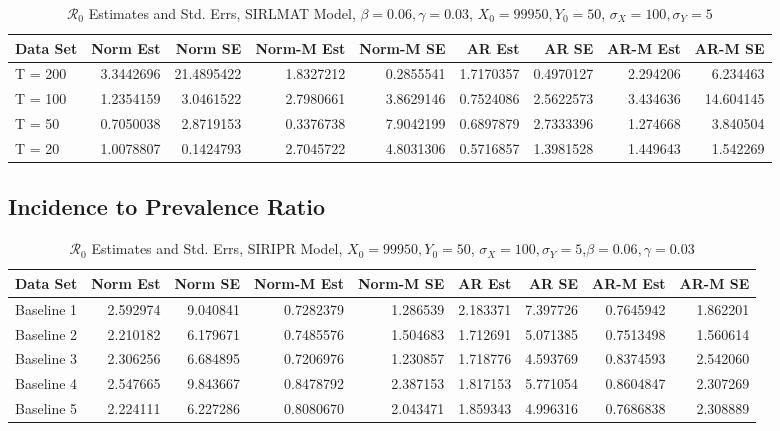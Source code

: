 \documentclass[12pt]{article}
\newcommand{\rr}{\ensuremath{\mathcal{R}_0}}
\begin{document}
\begin{table}[H]
	
	\caption{\label{tab:}$\rr$ Estimates and Std. Errs, SIRLMAT Model,
		$\beta = 0.06, \gamma = 0.03$, $X_0 = 99950, Y_0 = 50$, $\sigma_X = 100, \sigma_Y = 5$}
	\centering
	\begin{tabular}[t]{l|r|r|r|r|r|r|r|r}
		\hline
		Data Set & Norm Est & Norm SE & Norm-M Est & Norm-M SE & AR Est & AR SE & AR-M Est & AR-M SE\\
		\hline
		T = 200 & 3.3442696 & 21.4895422 & 1.8327212 & 0.2855541 & 1.7170357 & 0.4970127 & 2.294206 & 6.234463\\
		\hline
		T = 100 & 1.2354159 & 3.0461522 & 2.7980661 & 3.8629146 & 0.7524086 & 2.5622573 & 3.434636 & 14.604145\\
		\hline
		T = 50 & 0.7050038 & 2.8719153 & 0.3376738 & 7.9042199 & 0.6897879 & 2.7333396 & 1.274668 & 3.840504\\
		\hline
		T = 20 & 1.0078807 & 0.1424793 & 2.7045722 & 4.8031306 & 0.5716857 & 1.3981528 & 1.449643 & 1.542269\\
		\hline
	\end{tabular}
\end{table}

\subsection{Incidence to Prevalence Ratio}

\begin{table}[H]
	
	\caption{\label{tab:}$\rr$ Estimates and Std. Errs, SIRIPR Model,
		$X_0 = 99950, Y_0 = 50$, $\sigma_X = 100, \sigma_Y = 5$,$\beta = 0.06, \gamma = 0.03$}
	\centering
	\begin{footnotesize}
		\begin{tabular}[t]{l|r|r|r|r|r|r|r|r}
			\hline
			Data Set & Norm Est & Norm SE & Norm-M Est & Norm-M SE & AR Est & AR SE & AR-M Est & AR-M SE\\
			\hline
			Baseline 1 & 2.592974 & 9.040841 & 0.7282379 & 1.286539 & 2.183371 & 7.397726 & 0.7645942 & 1.862201\\
			\hline
			Baseline 2 & 2.210182 & 6.179671 & 0.7485576 & 1.504683 & 1.712691 & 5.071385 & 0.7513498 & 1.560614\\
			\hline
			Baseline 3 & 2.306256 & 6.684895 & 0.7206976 & 1.230857 & 1.718776 & 4.593769 & 0.8374593 & 2.542060\\
			\hline
			Baseline 4 & 2.547665 & 9.843667 & 0.8478792 & 2.387153 & 1.817153 & 5.771054 & 0.8604847 & 2.307269\\
			\hline
			Baseline 5 & 2.224111 & 6.227286 & 0.8080670 & 2.043471 & 1.859343 & 4.996316 & 0.7686838 & 2.308889\\
			\hline
		\end{tabular}
	\end{footnotesize}
\end{table}
\end{document}
